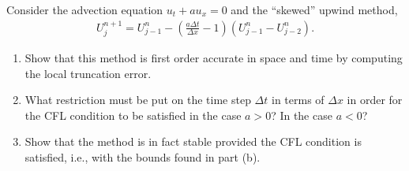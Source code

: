 \documentclass[10pt]{article}
\begin{document}
\begin{problem}
Consider the advection equation \( u_t + au_x = 0 \) and the ``skewed'' upwind method,
\begin{align*}
    U_j^{n+1} = U_{j-1}^n - \left( \frac{a\Delta t}{\Delta x}-1 \right)(U_{j-1}^n - U_{j-2}^n).
\end{align*}
\begin{enumerate}[label=(\alph*),nolistsep]
    \item Show that this method is first order accurate in space and time by computing the local truncation error.
    \item What restriction must be put on the time step \( \Delta t \) in terms of \( \Delta x \) in order for the CFL condition to be satisfied in the case \( a>0 \)? In the case \( a<0 \)?
    \item Show that the method is in fact stable provided the CFL condition is satisfied, i.e., with the bounds found in part (b).
\end{enumerate}
\end{problem}
\end{document}
